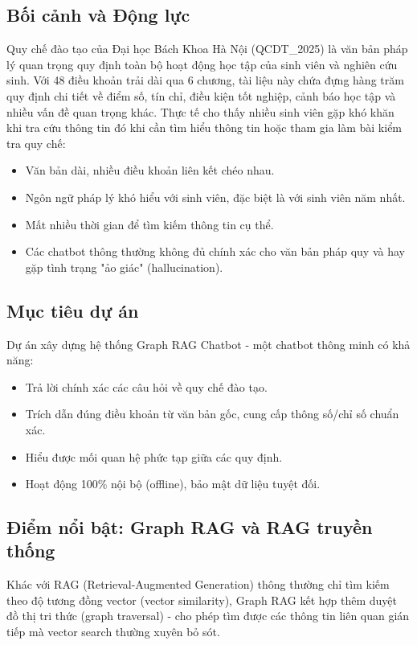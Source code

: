 \documentclass[12pt,a4paper]{article}
\begin{document}
\subsection{Bối cảnh và Động lực}
Quy chế đào tạo của Đại học Bách Khoa Hà Nội (QCDT\_2025) là văn bản pháp lý quan trọng quy định toàn bộ hoạt động học tập của sinh viên và nghiên cứu sinh. 
Với 48 điều khoản trải dài qua 6 chương, tài liệu này chứa đựng hàng trăm quy định chi tiết về điểm số, tín chỉ, điều kiện tốt nghiệp, cảnh báo học tập và nhiều vấn đề quan trọng khác. Thực tế cho thấy nhiều sinh viên gặp khó khăn khi tra cứu thông tin đó khi cần tìm hiểu thông tin hoặc tham gia làm bài kiểm tra quy chế:
\begin{itemize}
\item Văn bản dài, nhiều điều khoản liên kết chéo nhau.
\item Ngôn ngữ pháp lý khó hiểu với sinh viên, đặc biệt là với sinh viên năm nhất.
\item Mất nhiều thời gian để tìm kiếm thông tin cụ thể.
\item Các chatbot thông thường không đủ chính xác cho văn bản pháp quy và hay gặp tình trạng "ảo giác" (hallucination).
\end{itemize}

\subsection{Mục tiêu dự án}
Dự án xây dựng hệ thống Graph RAG Chatbot - một chatbot thông minh có khả năng:
\begin{itemize}
\item Trả lời chính xác các câu hỏi về quy chế đào tạo.
\item Trích dẫn đúng điều khoản từ văn bản gốc, cung cấp thông số/chỉ số chuẩn xác.
\item Hiểu được mối quan hệ phức tạp giữa các quy định.
\item Hoạt động 100\% nội bộ (offline), bảo mật dữ liệu tuyệt đối.
\end{itemize}

\subsection{Điểm nổi bật: Graph RAG và RAG truyền thống}
Khác với RAG (Retrieval-Augmented Generation) thông thường chỉ tìm kiếm theo độ tương đồng vector (vector similarity), Graph RAG kết hợp thêm duyệt đồ thị tri thức (graph traversal) - cho phép tìm được các thông tin liên quan gián tiếp mà vector search thường xuyên bỏ sót.
\end{document}

